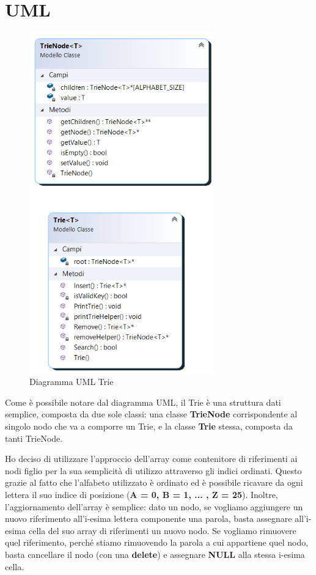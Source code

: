 \documentclass[a4paper, 12pt]{article}
\begin{document}
\clearpage

\section{UML}
\begin{figure}[ht!]
    \centering
    \includegraphics[width=8cm]{Images/ClassDiagram.png}
    \caption{Diagramma UML Trie}
    \label{fig:my_label}
\end{figure}

\clearpage

Come è possibile notare dal diagramma UML, il Trie è una struttura dati semplice, composta da due sole classi: una classe \textbf{TrieNode} corrispondente al singolo nodo che va a comporre un Trie, e la classe \textbf{Trie} stessa, composta da tanti TrieNode.

Ho deciso di utilizzare l'approccio dell'array come contenitore di riferimenti ai nodi figlio per la sua semplicità di utilizzo attraverso gli indici ordinati. Questo grazie al fatto che l'alfabeto utilizzato è ordinato ed è possibile ricavare da ogni lettera il suo indice di posizione (\textbf{A = 0, B = 1, ... , Z = 25}). Inoltre, l'aggiornamento dell'array è semplice: dato un nodo, se vogliamo aggiungere un nuovo riferimento all'i-esima lettera componente una parola, basta assegnare all'i-esima cella del suo array di riferimenti un nuovo nodo. Se vogliamo rimuovere quel riferimento, perché stiamo rimuovendo la parola a cui appartiene quel nodo, basta cancellare il nodo (con una \textbf{delete}) e assegnare \textbf{NULL} alla stessa i-esima cella.
\end{document}
